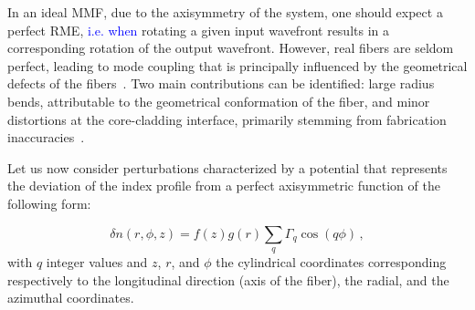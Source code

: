 \documentclass[aps,prl,twocolumn, amsmath,amssymb,superscriptaddress]{revtex4-2}
\newcommand{\red}[1]{\textcolor{red}{#1}}
\newcommand{\blue}[1]{\textcolor{blue}{#1}}
\newcommand{\so}[1]{\textcolor{green}{\sout{#1}}}
\begin{document}

In an ideal MMF, 
due to the axisymmetry of the system, 
one should expect a perfect RME, 
\blue{
i.e. when
} rotating a given input wavefront 
results in a corresponding rotation of the output wavefront. 
However, real fibers are seldom perfect, 
leading to mode coupling 
that is principally influenced by the 
geometrical defects of the fibers~\cite{ho2013mode}. 
Two main contributions can be identified: 
large radius bends, 
attributable to the geometrical conformation of the fiber,
and minor distortions at the core-cladding interface, 
primarily stemming from fabrication inaccuracies~\cite{Marcuse1973coupled, Mazumder2004analysis, bsaibes2023coupling}.

Let us now consider perturbations characterized by a potential 
that represents the deviation of the index profile from a perfect axisymmetric function 
of the following form:


\begin{equation}
    \delta n(r,\phi, z) = f(z)g(r) \sum_q \Gamma_q\cos(q\phi) \, ,
    \label{eq:disorder}
\end{equation} 
with $q$ integer values and 
$z$, $r$, and $\phi$ the cylindrical coordinates 
corresponding respectively to the longitudinal direction (axis of the fiber), 
the radial, and the azimuthal coordinates. 


\end{document}
